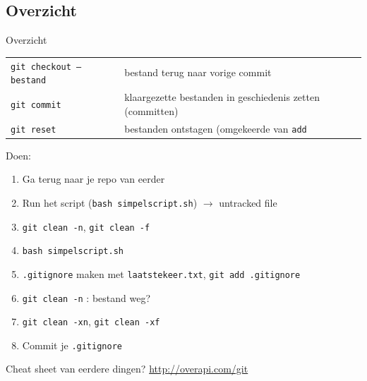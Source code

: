 \subsection{Overzicht}
\begin{frame}{Overzicht}
	{ \footnotesize
	\begin{tabular}{ll}
		\texttt{git checkout -- bestand}		& bestand terug naar vorige commit	\\
		\texttt{git commit} & klaargezette bestanden in geschiedenis zetten (committen)\\
		\texttt{git reset}	& bestanden ontstagen (omgekeerde van \texttt{add}
	\end{tabular}
	}
	Doen:
	\begin{enumerate}
		\item Ga terug naar je repo van eerder
		\item Run het script (\texttt{bash simpelscript.sh}) $\rightarrow$ untracked file
		\item \texttt{git clean -n}, \texttt{git clean -f}
		\item \texttt{bash simpelscript.sh}
		\item \texttt{.gitignore} maken met \texttt{laatstekeer.txt}, \texttt{git add .gitignore}
		\item \texttt{git clean -n} : bestand weg?
		\item \texttt{git clean -xn}, \texttt{git clean -xf}
		\item Commit je \texttt{.gitignore}
	\end{enumerate}
	Cheat sheet van eerdere dingen? \url{http://overapi.com/git}
\end{frame}
